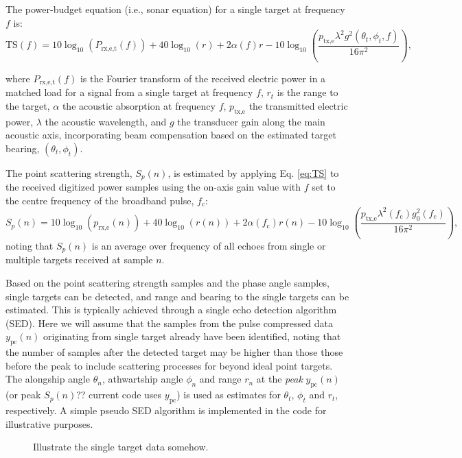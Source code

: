 \documentclass[preprint,12pt,TurnOnLineNumbers]{JASAnew}
\newcommand{\freqsym}{f}
\newcommand{\samplesymt}{n}
\newcommand{\fc}{f_{\textrm{c}}}
\newcommand{\ptxe}{p_{\textrm{tx,e}}}
\newcommand{\prxe}{p_{\textrm{rx,e}}}
\newcommand{\ypc}{y_{\textrm{pc}}}
\newcommand{\prxetf}{P_{\textrm{rx,e,t}}}
\newcommand{\mysp}{S_p}
\newcommand{\ts}{\textrm{TS}}
\newcommand{\range}{r}
\newcommand{\athw}{\phi}
\newcommand{\along}{\theta}
\newcommand{\gain}{g}
\newcommand{\gainzero}{g_0}
\newcommand{\wlen}{\lambda}
\newcommand{\absorp}{\alpha}
\begin{document}
The power-budget equation (i.e., sonar equation) for a single target \citep[Formulation D, ][]{lunde2016} at frequency $\freqsym$ is:
%
\begin{equation}
\label{eq:TS}
\ts(\freqsym) = 10\log_{10}(\prxetf(\freqsym)) + 40\log_{10}(\range) + 2\absorp(\freqsym) \range 
- 10\log_{10}\left( \frac{\ptxe \wlen^2 \gain^2(\along_t,\athw_t,\freqsym)}{16\pi^2} \right),
\end{equation}
%

where $\prxetf(\freqsym)$ is the Fourier transform of the received electric power in a matched load for a signal from a single target at frequency $\freqsym$, $\range_t$ is the range to the target, $\absorp$ the acoustic absorption at frequency $f$, $\ptxe$ the transmitted electric power, $\wlen$ the acoustic wavelength, and $\gain$ the transducer gain along the main acoustic axis, incorporating beam compensation based on the estimated target bearing, $(\along_t,\athw_t)$.

The point scattering strength, $\mysp(\samplesymt)$, is estimated by applying Eq. \ref{eq:TS} to the received digitized power samples using the on-axis gain value with $f$ set to the centre frequency of the broadband pulse, $\fc$: 
\begin{equation}
\label{eq:Sp}
\mysp(\samplesymt) = 10\log_{10}(\prxe(\samplesymt)) + 40\log_{10}(\range(\samplesymt)) 
+ 2\absorp(\fc) \range(\samplesymt) - 10\log_{10}\left( \frac{\ptxe \wlen^2(\fc) \gainzero^2(\fc)}{16\pi^2} \right),
\end{equation}
%
noting that $\mysp(\samplesymt)$ is an average over frequency of all echoes from single or multiple targets received at sample $\samplesymt$.

Based on the point scattering strength samples and the phase angle samples, single targets can be detected, and range and bearing to the single targets can be estimated. This is typically achieved through a single echo detection algorithm (SED). Here we will assume that the samples from the pulse compressed data $\ypc(\samplesymt)$ originating from single target already have been identified, noting that the number of samples after the detected target may be higher than those those before the peak to include scattering processes for beyond ideal point targets. The alongship angle $\along_n$, athwartship angle $\athw_n$ and range $r_n$ at the \emph{peak} $\ypc(\samplesymt)$ (or peak $S_p(n)$?? current code uses $\ypc$) is used as estimates for $\along_t$, $\athw_t$ and $r_t$, respectively. A simple pseudo SED algorithm is implemented in the code for illustrative purposes.
%
\begin{figure}
\caption{\label{fi:SED}Illustrate the single target data somehow.}
\end{figure}
\end{document}
